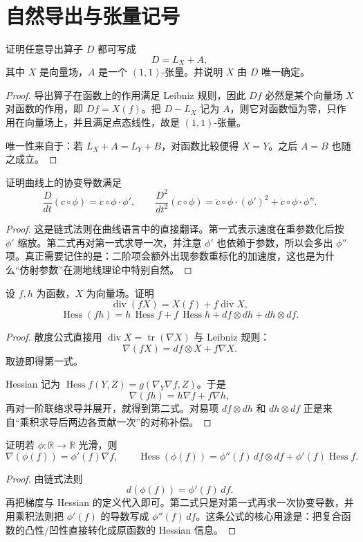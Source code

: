 \documentclass[11pt,a4paper,openany]{ctexbook}
\numberwithin{equation}{chapter}
\begin{document}
\section{自然导出与张量记号}

\begin{problem}
证明任意导出算子 \(D\) 都可写成
\[
D=L_X+A,
\]
其中 \(X\) 是向量场，\(A\) 是一个 \((1,1)\)-张量。并说明 \(X\) 由 \(D\) 唯一确定。
\end{problem}
\begin{proof}
导出算子在函数上的作用满足 Leibniz 规则，因此 \(Df\) 必然是某个向量场 \(X\) 对函数的作用，即 \(Df=X(f)\)。把 \(D-L_X\) 记为 \(A\)，则它对函数恒为零，只作用在向量场上，并且满足点态线性，故是 \((1,1)\)-张量。

唯一性来自于：若 \(L_X+ A=L_Y+B\)，对函数比较便得 \(X=Y\)。之后 \(A=B\) 也随之成立。
\end{proof}

\begin{problem}
证明曲线上的协变导数满足
\[
\frac{D}{dt}(c\circ\phi)=\dot c\circ\phi\cdot \phi',\qquad
\frac{D^2}{dt^2}(c\circ\phi)=\ddot c\circ\phi\cdot(\phi')^2+\dot c\circ\phi\cdot\phi''.
\]
\end{problem}
\begin{proof}
这是链式法则在曲线语言中的直接翻译。第一式表示速度在重参数化后按 \(\phi'\) 缩放。第二式再对第一式求导一次，并注意 \(\phi'\) 也依赖于参数，所以会多出 \(\phi''\) 项。真正需要记住的是：二阶项会额外出现参数重标化的加速度，这也是为什么“仿射参数”在测地线理论中特别自然。
\end{proof}

\begin{problem}
设 \(f,h\) 为函数，\(X\) 为向量场。证明
\[
\operatorname{div}(fX)=X(f)+f\operatorname{div}X,
\]
\[
\operatorname{Hess}(fh)=h\,\operatorname{Hess}f+f\,\operatorname{Hess}h+df\otimes dh+dh\otimes df.
\]
\end{problem}
\begin{proof}
散度公式直接用 \(\operatorname{div}X=\operatorname{tr}(\nabla X)\) 与 Leibniz 规则：
\[
\nabla(fX)=df\otimes X+f\nabla X.
\]
取迹即得第一式。

Hessian 记为 \(\operatorname{Hess}f(Y,Z)=g(\nabla_Y\nabla f,Z)\)。于是
\[
\nabla(fh)=h\nabla f+f\nabla h,
\]
再对一阶联络求导并展开，就得到第二式。对易项 \(df\otimes dh\) 和 \(dh\otimes df\) 正是来自“乘积求导后两边各贡献一次”的对称补偿。
\end{proof}

\begin{problem}
证明若 \(\phi\colon\mathbb R\to\mathbb R\) 光滑，则
\[
\nabla(\phi(f))=\phi'(f)\nabla f,\qquad
\operatorname{Hess}(\phi(f))=\phi''(f)\,df\otimes df+\phi'(f)\operatorname{Hess}f.
\]
\end{problem}
\begin{proof}
由链式法则
\[
d(\phi(f))=\phi'(f)\,df.
\]
再把梯度与 Hessian 的定义代入即可。第二式只是对第一式再求一次协变导数，并用乘积法则把 \(\phi'(f)\) 的导数写成 \(\phi''(f)\,df\)。这条公式的核心用途是：把复合函数的凸性/凹性直接转化成原函数的 Hessian 信息。
\end{proof}
\end{document}
